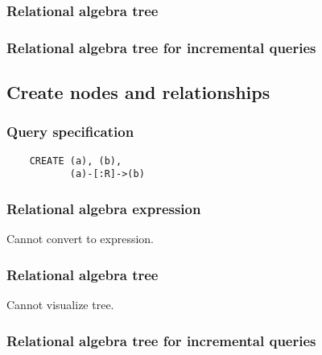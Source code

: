 	\subsubsection*{Relational algebra tree}


	\subsubsection*{Relational algebra tree for incremental queries}

	\subsection{Create nodes and relationships}

	\subsubsection*{Query specification}

	\begin{lstlisting}
	CREATE (a), (b),
	       (a)-[:R]->(b)
	\end{lstlisting}


	\subsubsection*{Relational algebra expression}

	Cannot convert to expression.

	\subsubsection*{Relational algebra tree}

	Cannot visualize tree.

	\subsubsection*{Relational algebra tree for incremental queries}

